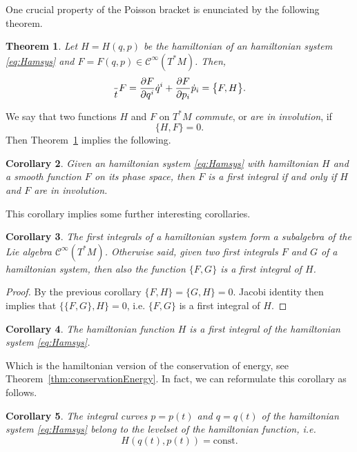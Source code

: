 \documentclass[english,fontsize=11pt,paper=a5,oneside]{scrbook}
\newcommand{\cC}{\mathcal{C}}
\let\d\relax
\DeclareMathOperator{\d}{d}
\newtheorem{theorem}{Theorem}[chapter]
\newtheorem{corollary}[theorem]{Corollary}
\theoremstyle{definition}
\begin{document}
One crucial property of the Poisson bracket is enunciated by the following theorem.

\begin{theorem}\label{thm:poissondtdF}
    Let $H=H(q,p)$ be the hamiltonian of an hamiltonian system \eqref{eq:Hamsys} and $F=F(q,p)\in\cC^\infty(T^*M)$.
    Then,
    \begin{equation}
        \frac{\d}{\d t} F = \frac{\partial F}{\partial q^i} \dot q^i + \frac{\partial F}{\partial p_i} \dot p_i = \big\{F,H\big\}.
    \end{equation}
\end{theorem}

We say that two functions $H$ and $F$ on $T^* M$ \emph{commute}, or \emph{are in involution}, if
\begin{equation}
    \big\{H,F\big\} = 0.
\end{equation}
Then Theorem~\ref{thm:poissondtdF} implies the following.
\begin{corollary}
    Given an hamiltonian system \eqref{eq:Hamsys} with hamiltonian $H$ and a smooth function $F$ on its phase space, then $F$ is a first integral if and only if $H$ and $F$ are in involution.
\end{corollary}

This corollary implies some further interesting corollaries.
\begin{corollary}
    The first integrals of a hamiltonian system form a subalgebra of the Lie algebra $\cC^\infty(T^*M)$.
    Otherwise said, given two first integrals $F$ and $G$ of a hamiltonian system, then also the function $\big\{F,G\big\}$ is a first integral of $H$.
\end{corollary}
\begin{proof}
    By the previous corollary $\big\{F,H\big\} = \big\{G,H\big\} = 0$.
    Jacobi identity then implies that $\big\{\big\{F,G\big\},H\big\} = 0$, i.e. $\big\{F,G\big\}$ is a first integral of $H$.
\end{proof}

\begin{corollary}
    The hamiltonian function $H$ is a first integral of the hamiltonian system \eqref{eq:Hamsys}.
\end{corollary}
Which is the hamiltonian version of the conservation of energy, see Theorem~\ref{thm:conservationEnergy}.
In fact, we can reformulate this corollary as follows.
\begin{corollary}
    The integral curves $p = p(t)$ and $q=q(t)$ of the hamiltonian system \eqref{eq:Hamsys} belong to the levelset of the hamiltonian function, i.e.
    \begin{equation}
        H(q(t), p(t)) = \mathrm{const}.
    \end{equation}
\end{corollary}
\end{document}
